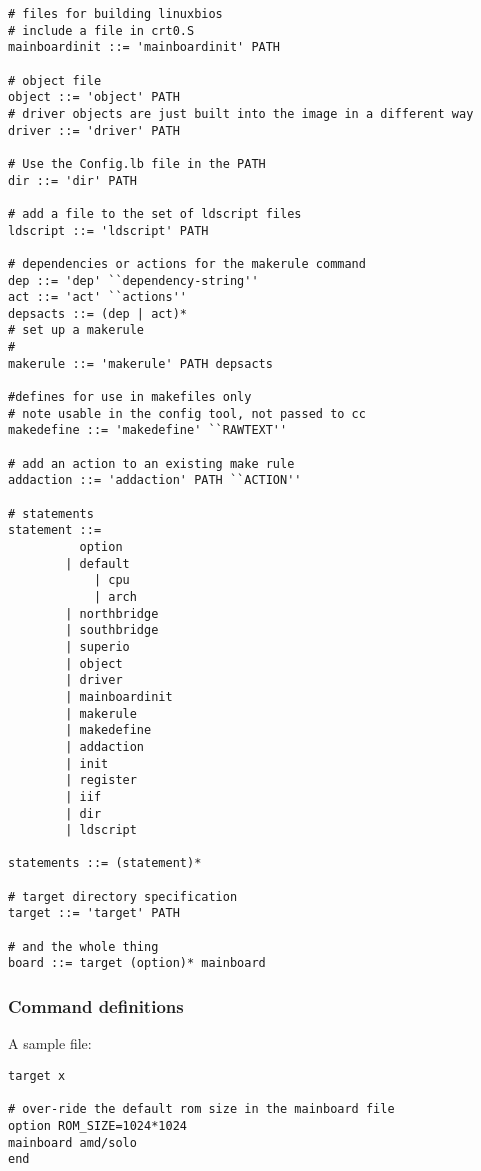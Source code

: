 \begin{verbatim}
# files for building linuxbios
# include a file in crt0.S 
mainboardinit ::= 'mainboardinit' PATH 

# object file 
object ::= 'object' PATH
# driver objects are just built into the image in a different way
driver ::= 'driver' PATH

# Use the Config.lb file in the PATH
dir ::= 'dir' PATH

# add a file to the set of ldscript files
ldscript ::= 'ldscript' PATH

# dependencies or actions for the makerule command
dep ::= 'dep' ``dependency-string''
act ::= 'act' ``actions''
depsacts ::= (dep | act)*
# set up a makerule
#
makerule ::= 'makerule' PATH depsacts

#defines for use in makefiles only
# note usable in the config tool, not passed to cc
makedefine ::= 'makedefine' ``RAWTEXT''

# add an action to an existing make rule
addaction ::= 'addaction' PATH ``ACTION''

# statements
statement ::= 
		  option
		| default
        	| cpu
        	| arch
		| northbridge
		| southbridge
		| superio
		| object
		| driver
		| mainboardinit
		| makerule
		| makedefine
		| addaction
		| init
		| register
		| iif
		| dir
		| ldscript

statements ::= (statement)*

# target directory specification
target ::= 'target' PATH

# and the whole thing
board ::= target (option)* mainboard

\end{verbatim}

\subsubsection{Command definitions}


A sample file:

\begin{verbatim}
target x

# over-ride the default rom size in the mainboard file
option ROM_SIZE=1024*1024
mainboard amd/solo
end

\end{verbatim}

